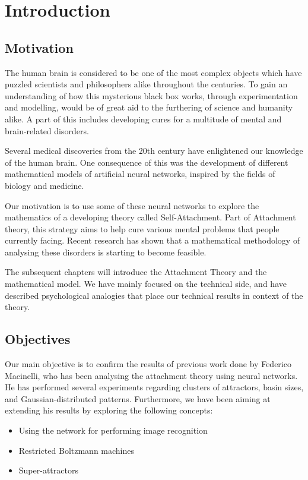 \chapter{Introduction}

\section{Motivation}

The human brain is considered to be one of the most complex objects which have puzzled scientists and philosophers alike throughout the centuries. To gain an understanding of how this mysterious black box works, through experimentation and modelling, would be of great aid to the furthering of science and humanity alike. A part of this includes developing cures for a multitude of mental and brain-related disorders.

Several medical discoveries from the 20th century have enlightened our knowledge of the human brain. One consequence of this was the development of different mathematical models of artificial neural networks, inspired by the fields of biology and medicine.

Our motivation is to use some of these neural networks to explore the mathematics of a developing theory called Self-Attachment. Part of Attachment theory, this strategy aims to help cure various mental problems that people currently facing. Recent research has shown that a mathematical methodology of analysing these disorders is starting to become feasible. \cite{net_model_neuroses}

The subsequent chapters will introduce the Attachment Theory and the mathematical model. We have mainly focused on the technical side, and have described psychological analogies that place our technical results in context of the theory.

\section{Objectives}

Our main objective is to confirm the results of previous work done by Federico Macinelli, who has been analysing the attachment theory using neural networks. He has performed several experiments regarding clusters of attractors, basin sizes, and Gaussian-distributed patterns. Furthermore, we have been aiming at extending his results by exploring the following concepts:
\begin{itemize}
\item Using the network for performing image recognition
\item Restricted Boltzmann machines
\item Super-attractors
\end{itemize}

